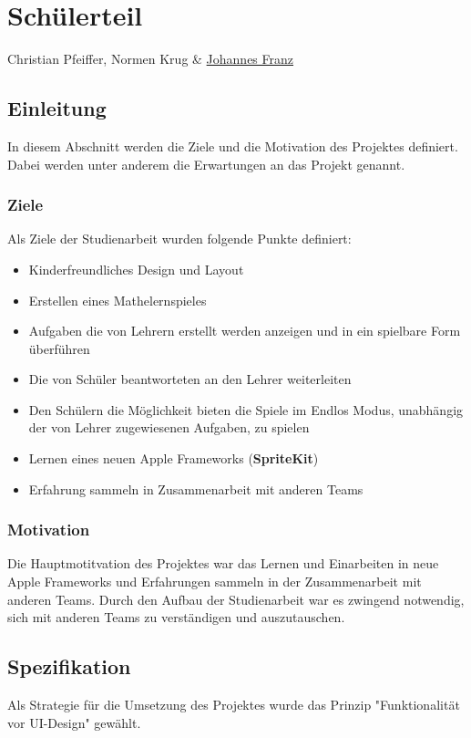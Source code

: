 \chapter{Schülerteil}
Christian Pfeiffer, Normen Krug \& \href{mailto:jofranz90@gmail.com?subject=Swift-Studienarbeit}{Johannes Franz}



\section{Einleitung}
In diesem Abschnitt werden die Ziele und die Motivation des Projektes definiert. Dabei werden unter anderem die Erwartungen an das Projekt genannt.
\subsection{Ziele}
Als Ziele der Studienarbeit wurden folgende Punkte definiert: 
\begin{itemize}
\item Kinderfreundliches Design und Layout
\item Erstellen eines Mathelernspieles 
\item Aufgaben die von Lehrern erstellt werden anzeigen und in ein spielbare Form überführen
\item Die von Schüler beantworteten an den Lehrer weiterleiten
\item Den Schülern die Möglichkeit bieten die Spiele im Endlos Modus, unabhängig der von Lehrer zugewiesenen Aufgaben, zu spielen
\item Lernen eines neuen Apple Frameworks (\textbf{SpriteKit})
\item Erfahrung sammeln in Zusammenarbeit mit anderen Teams
\end{itemize}
\subsection{Motivation}
Die Hauptmotitvation des Projektes war das Lernen und Einarbeiten in neue Apple Frameworks und Erfahrungen sammeln in der Zusammenarbeit mit anderen Teams. Durch den Aufbau der  Studienarbeit war es zwingend notwendig, sich mit anderen Teams zu verständigen und auszutauschen.  
\section{Spezifikation}
Als Strategie für die Umsetzung des Projektes wurde das Prinzip "Funktionalität vor UI-Design" gewählt.
